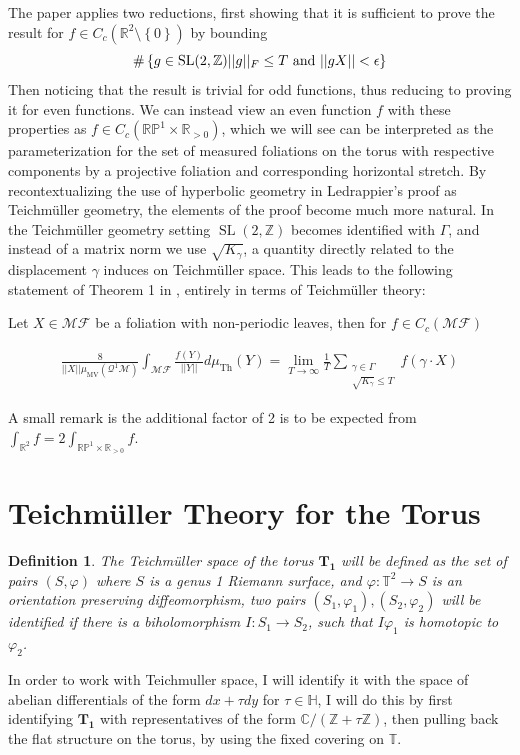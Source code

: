 \documentclass{article}
\newtheorem{defn}{Definition}
\newcommand{\set}[1]{\left\{#1\right\}}
\newcommand{\norm}[1]{\lvert\lvert#1\rvert\rvert}
\newcommand{\tand}{\text{ and }}
\newcommand{\slz}{\operatorname{SL}(2,\mathbb{Z})}
\newcommand{\vp}{\varphi}
\begin{document}
    The paper applies two reductions, first showing that it is sufficient to prove the result for \(f \in C_c(\mathbb{R}^2 \setminus \set{0})\) by bounding \[\#\set{g \in \slz \\ \norm{g}_F \leq T \tand \norm{gX} < \epsilon}\] Then noticing that the result is trivial for odd functions, thus reducing to proving it for even functions. We can instead view an even function \(f\) with these properties as \(f \in C_c(\mathbb{RP}^1 \times \mathbb{R}_{>0})\), which we will see can be interpreted as the parameterization for the set of measured foliations on the torus with respective components by a projective foliation and corresponding horizontal stretch. By recontextualizing the use of hyperbolic geometry in Ledrappier's proof as Teichm\"uller geometry, the elements of the proof become much more natural. In the Teichm\"uller geometry setting \(\slz\) becomes identified with \(\Gamma\), and instead of a matrix norm we use \(\sqrt{K_\gamma}\), a quantity directly related to the displacement \(\gamma\) induces on Teichm\"uller space. This leads to the following statement of Theorem 1 in \cite{Ledrappier_1999}, entirely in terms of Teichm\"uller theory:

    Let \(X \in \mathscr{MF}\) be a foliation with non-periodic leaves, then for \(f \in C_c(\mathscr{MF})\)

    \begin{align*}
        \frac{8}{\norm{X}\mu_{\operatorname{MV}}(\mathcal{Q}^1 \mathcal{M})}\int_{\mathscr{MF}}\frac{f(Y)}{\norm{Y}}d\mu_{\operatorname{Th}}(Y) = \lim_{T\to\infty}\frac{1}{T}\sum_{\substack{\gamma \in \Gamma \\ \sqrt{K_\gamma} \leq T}}f(\gamma \cdot X)
    \end{align*}

    A small remark is the additional factor of 2 is to be expected from \(\int_{\mathbb{R}^2} f = 2\int_{\mathbb{RP}^1 \times \mathbb{R}_{>0}} f\).

    \section{Teichm\"uller Theory for the Torus}
    \begin{defn}
        The Teichm\"uller space of the torus \(\mathbf{T_1}\) will be defined as the set of pairs \((S,\vp)\) where \(S\) is a genus 1 Riemann surface, and \(\varphi: \mathbb{T}^2 \to S\) is an orientation preserving diffeomorphism, two pairs \((S_1,\vp_1),(S_2,\vp_2)\) will be identified if there is a biholomorphism \(I: S_1 \to S_2\), such that \(I\vp_1\) is homotopic to \(\vp_2\).
    \end{defn}
    In order to work with Teichmuller space, I will identify it with the space of abelian differentials of the form \(dx + \tau dy\) for \(\tau \in \mathbb{H}\), I will do this by first identifying \(\mathbf{T_1}\) with representatives of the form \(\mathbb{C}/(\mathbb{Z} + \tau\mathbb{Z})\), then pulling back the flat structure on the torus, by using the fixed covering on \(\mathbb{T}\).
    
\end{document}
